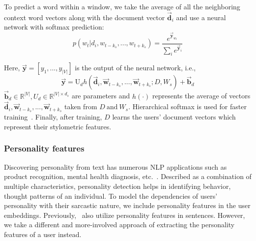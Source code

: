 \documentclass[11pt]{article}
\begin{document}
To predict a word within a window, we take the average of all the neighboring context word vectors along with the document vector $\vec{\bm{d}}_{i}$ and use a neural network with softmax prediction: \begin{equation}
p(w_t | d_{i}, w_{t-k_s},..., w_{t+k_s}) = \frac{e^{\vec{\bm{y}}_{w_t}}}{\sum_ie^{\vec{\bm{y}}_i}}
\end{equation}

Here, $\vec{\bm{y}} = [y_1, ..., y_{|V|}]$ is the output of the neural network, i.e.,
\begin{equation}
\vec{\bm{y}} = \text{U}_dh(\vec{\bm{d}}_{i},\vec{\bm{w}}_{t-k_s},..., \vec{\bm{w}}_{t+k_s};D,W_s) + \vec{\bm{b}}_d
\end{equation}
$\vec{\bm{b}}_d \in \mathbb{R}^{|V|}, U_d \in \mathbb{R}^{|V| \times d_s}$ are parameters and $h(\cdot)$ represents the average of vectors $\vec{\bm{d}}_{i},\vec{\bm{w}}_{t-k_s},..., \vec{\bm{w}}_{t+k_s}$ taken from $D \ \text{and} \ W_s$. Hierarchical softmax is used for faster training~\cite{morin2005hierarchical}. Finally, after training, $D$ learns the users' document vectors which represent their stylometric features.




\subsubsection{Personality features} \label{sec:personality}

Discovering personality from text has numerous NLP applications such as product recognition, mental health diagnosis, etc.~\cite{majumder2017deep}. Described as a combination of multiple characteristics, personality detection helps in identifying behavior, thought patterns of an individual. To model the dependencies of users' personality with their sarcastic nature, we include personality features in the user embeddings.
Previously,~ also utilize personality features in sentences. However, we take a different and more-involved approach of extracting the personality features of a user instead.
\end{document}
